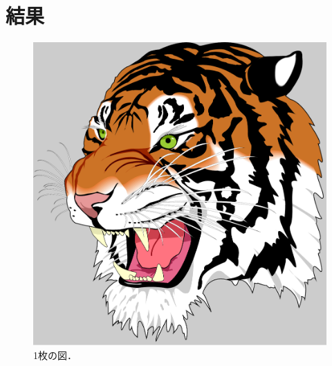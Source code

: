 
\chapter{結果}
\label{ch:result}


\begin{figure}[t]
    \centering
    \includegraphics[width=0.5\columnwidth]{figure/tiger.pdf}
    \caption{1枚の図．}
    \label{fig:one_figure}
\end{figure}



